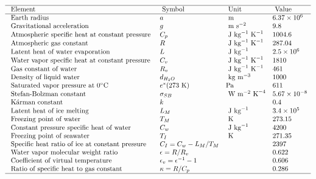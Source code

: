 \begin{eqnarray}
\begin{array}{llll}
\hline \text { Element } & \text { Symbol } & \text { Unit } & \text { Value } \\
\hline \text { Earth radius } & a & \mathrm{~m} & 6.37 \times 10^{6} \\
\text { Gravitational acceleration } & g & \mathrm{~m} \mathrm{~s}^{-2} & 9.8 \\
\text { Atmospheric specific heat at constant pressure } & C_{p} & \mathrm{~J} \mathrm{~kg}^{-1} \mathrm{~K}^{-1} & 1004.6 \\
\text { Atmospheric gas constant } & R & \mathrm{~J} \mathrm{~kg}^{-1} \mathrm{~K}^{-1} & 287.04 \\
\text { Latent heat of water evaporation } & L & \mathrm{~J} \mathrm{~kg}^{-1} & 2.5 \times 10^{6} \\
\text { Water vapor specific heat at constant pressure } & C_{v} & \mathrm{~J} \mathrm{~kg}^{-1} \mathrm{~K}^{-1} & 1810 \\
\text { Gas constant of water } & R_{v} & \mathrm{~J} \mathrm{~kg}^{-1} \mathrm{~K}^{-1} & 461 \\
\text { Density of liquid water } & d_{H_{2} O} & \mathrm{~kg} \mathrm{~m}^{-3} & 1000 \\
\text { Saturated vapor pressure at } 0{ }^{\circ} \mathrm{C} & e^{*}(273 \mathrm{~K}) & \mathrm{Pa} & 611 \\
\text { Stefan-Bolzman constant } & \sigma_{S B} & \mathrm{~W} \mathrm{~m}^{-2} \mathrm{~K}^{-4} & 5.67 \times 10^{-8} \\
\text { Kárman constant } & k & & 0.4 \\
\text { Latent heat of ice melting } & L_{M} & \mathrm{~J} \mathrm{~kg}^{-1} & 3.4 \times 10^{5} \\
\text { Freezing point of water } & T_{M} & \mathrm{~K} & 273.15 \\
\text { Constant pressure specific heat of water } & C_{w} & \mathrm{~J} \mathrm{~kg}^{-1} & 4200 \\
\text { Freezing point of seawater } & T_{I} & \mathrm{~K} & 271.35 \\
\text { Specific heat ratio of ice at constant pressure } & C_{I}=C_{w}-L_{M} / T_{M} & & 2397 \\
\text { Water vapor molecular weight ratio } & \epsilon=R / R_{v} & & 0.622 \\
\text { Coefficient of virtual temperature } & \epsilon_{v}=\epsilon^{-1}-1 & & 0.606 \\
\text { Ratio of specific heat to gas constant } & \kappa=R / C_{p} & & 0.286 \\
\hline
\end{array}
\end{eqnarray}
